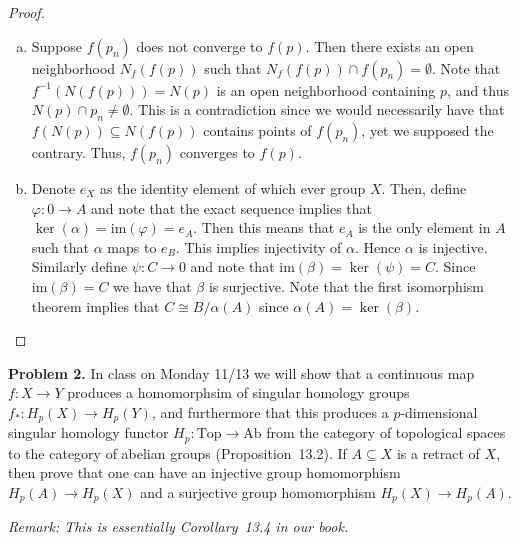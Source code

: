 \documentclass[leqno]{article}
\theoremstyle{nonumberplain}
\newtheorem{proof}{Proof}
\newcommand{\im}{\ensuremath{\mathrm{im}}}
\begin{document}
\begin{proof}~
\begin{enumerate}[(a)]
\item Suppose $f(p_n)$ does not converge to $f(p)$. Then there exists an open neighborhood $N_f(f(p))$ such that $N_f(f(p))\cap f(p_n)=\emptyset$. Note that $f^{-1}(N(f(p)))=N(p)$ is an open neighborhood containing $p$, and thus $N(p)\cap p_n \neq \emptyset$. This is a contradiction since we would necessarily have that $f(N(p))\subseteq N(f(p))$ contains points of $f(p_n)$, yet we supposed the contrary. Thus, $f(p_n)$ converges to $f(p)$.

\item Denote $e_X$ as the identity element of which ever group $X$. Then, define $\varphi\colon 0\to A$ and note that the exact sequence implies that $\ker(\alpha)=\im(\varphi)=e_A$. Then this means that $e_A$ is the only element in $A$ such that $\alpha$ maps to $e_B$. This implies injectivity of $\alpha$. Hence $\alpha$ is injective.  Similarly define $\psi \colon C \to 0$ and note that $\im(\beta)=\ker(\psi)=C$. Since $\im(\beta)=C$ we have that $\beta$ is surjective. Note that the first isomorphism theorem implies that $C\cong B/\alpha(A)$ since $\alpha(A)=\ker(\beta)$.

\end{enumerate}

\end{proof}

\pagebreak



\noindent\textbf{Problem 2.} In class on Monday 11/13 we will show that a continuous map $f\colon X\to Y$ produces a homomorphsim of singular homology groups $f_*\colon H_p(X)\to H_p(Y)$, and furthermore that this produces a $p$-dimensional singular homology functor $H_p\colon \mathrm{Top}\to \mathrm{Ab}$ from the category of topological spaces to the category of abelian groups (Proposition~13.2). If $A\subseteq X$ is a retract of $X$, then prove that one can have an injective group homomorphism $H_p(A)\to H_p(X)$ and a surjective group homomorphism $H_p(X)\to H_p(A)$. 

\emph{Remark: This is essentially Corollary~13.4 in our book.}
\end{document}
